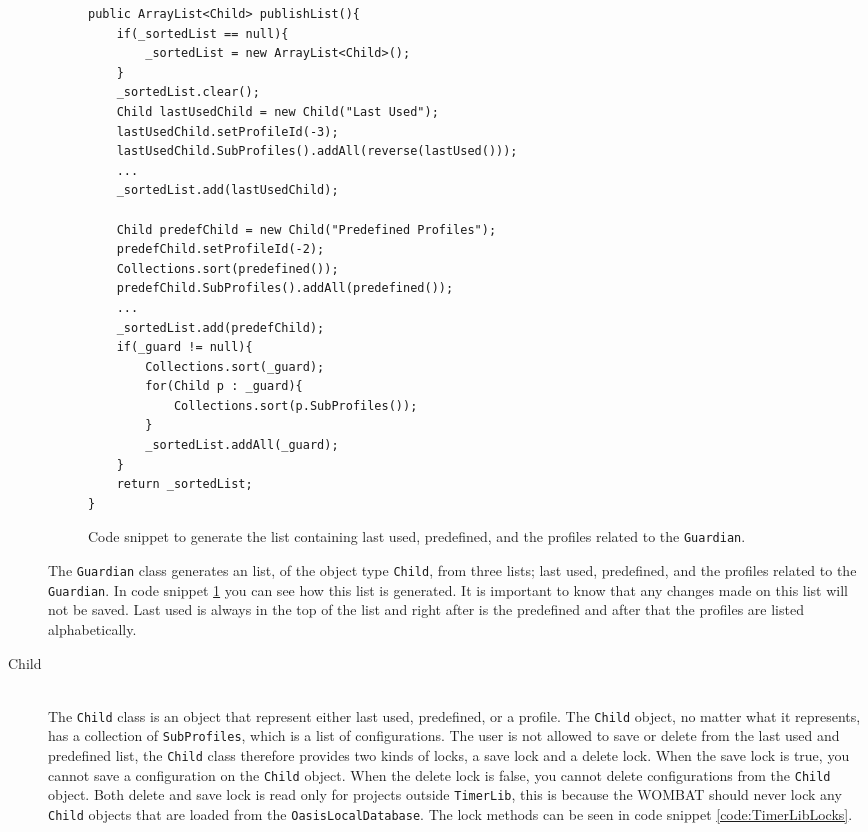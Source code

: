\begin{description}
		\begin{figure}[H]
\begin{lstlisting}
public ArrayList<Child> publishList(){
	if(_sortedList == null){
		_sortedList = new ArrayList<Child>();
	}
	_sortedList.clear();
	Child lastUsedChild = new Child("Last Used");
	lastUsedChild.setProfileId(-3);
	lastUsedChild.SubProfiles().addAll(reverse(lastUsed()));
	...
	_sortedList.add(lastUsedChild);
	
	Child predefChild = new Child("Predefined Profiles");
	predefChild.setProfileId(-2);
	Collections.sort(predefined());
	predefChild.SubProfiles().addAll(predefined());
	...
	_sortedList.add(predefChild);
	if(_guard != null){
		Collections.sort(_guard);
		for(Child p : _guard){
			Collections.sort(p.SubProfiles());
		}
		_sortedList.addAll(_guard);
	}
	return _sortedList;
}
\end{lstlisting}
\caption{Code snippet to generate the list containing last used, predefined, and the profiles related to the \texttt{Guardian}.}%
\label{code:publishList}%
\end{figure}

The \texttt{Guardian} class generates an list, of the object type \texttt{Child}, from three lists; last used, predefined, and the profiles related to the \texttt{Guardian}.
In code snippet \ref{code:publishList} you can see how this list is generated.
It is important to know that any changes made on this list will not be saved.
Last used is always in the top of the list and right after is the predefined and after that the profiles are listed alphabetically.
	
  \item[Child] \hfill \\
The \texttt{Child} class is an object that represent either last used, predefined, or a profile. The \texttt{Child} object, no matter what it represents, has a collection of \texttt{SubProfiles}, which is a list of configurations. The user is not allowed to save or delete from the last used and predefined list, the \texttt{Child} class therefore provides two kinds of locks, a save lock and a delete lock. When the save lock is true, you cannot save a configuration on the \texttt{Child} object. When the delete lock is false, you cannot delete configurations from the \texttt{Child} object. Both delete and save lock is read only for projects outside \texttt{TimerLib}, this is because the WOMBAT should never lock any \texttt{Child} objects that are loaded from the \texttt{OasisLocalDatabase}. The lock methods can be seen in code snippet \ref{code:TimerLibLocks}.


\end{description}

